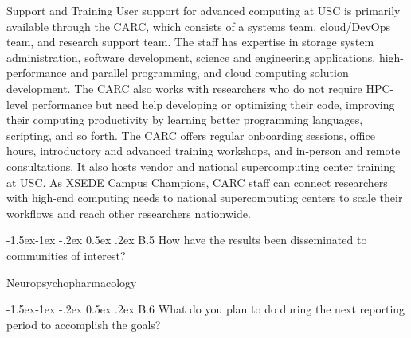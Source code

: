\documentclass[11pt,]{article}
\makeatletter
\renewcommand\subsection{
  \@startsection{subsection}{2}{\z@}
    {-1.5ex\@plus -1ex \@minus -.2ex}%
    {0.5ex \@plus .2ex}%
    {\normalfont\normalsize\bf}} %
\makeatother
\begin{document}
Support and Training User support for advanced computing at USC is primarily available through the CARC, which consists of a systems team, cloud/DevOps team, and research support team.
The staff has expertise in storage system administration, software development, science and engineering applications, high-performance and parallel programming, and cloud computing solution development.
The CARC also works with researchers who do not require HPC-level performance but need help developing or optimizing their code, improving their computing productivity by learning better programming languages, scripting, and so forth.
The CARC offers regular onboarding sessions, office hours, introductory and advanced training workshops, and in-person and remote consultations.
It also hosts vendor and national supercomputing center training at USC.
As XSEDE Campus Champions, CARC staff can connect researchers with high-end computing needs to national supercomputing centers to scale their workflows and reach other researchers nationwide.

\hypertarget{b.5-how-have-the-results-been-disseminated-to-communities-of-interest}{%
\subsection{B.5 How have the results been disseminated to communities of interest?}\label{b.5-how-have-the-results-been-disseminated-to-communities-of-interest}}

Neuropsychopharmacology

\hypertarget{b.6-what-do-you-plan-to-do-during-the-next-reporting-period-to-accomplish-the-goals}{%
\subsection{B.6 What do you plan to do during the next reporting period to accomplish the goals?}\label{b.6-what-do-you-plan-to-do-during-the-next-reporting-period-to-accomplish-the-goals}}


\end{document}
